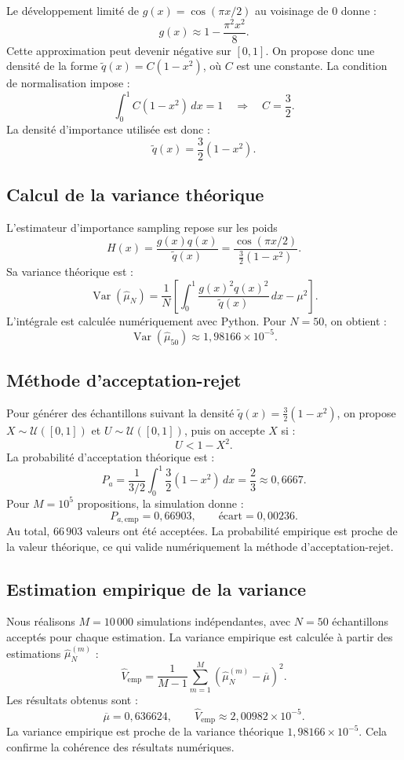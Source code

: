 \documentclass[11pt]{article}
\theoremstyle{definition}
\theoremstyle{remark}
\begin{document}
Le développement limité de $g(x)=\cos(\pi x/2)$ au voisinage de $0$ donne :
\[
g(x)\approx 1-\frac{\pi^2x^2}{8}.
\]
Cette approximation peut devenir négative sur $[0,1]$. On propose donc une
densité de la forme $\widetilde q(x)=C(1-x^2)$, où $C$ est une constante. La
condition de normalisation impose :
\[
\int_0^1 C(1-x^2)\,dx=1
\quad\Longrightarrow\quad C=\frac32.
\]
La densité d'importance utilisée est donc :
\[
\boxed{\widetilde q(x)=\frac32(1-x^2).}
\]

\subsection{Calcul de la variance théorique}

L'estimateur d'importance sampling repose sur les poids
\[
H(x)=\frac{g(x)q(x)}{\widetilde q(x)}
=\frac{\cos(\pi x/2)}{\frac32(1-x^2)}.
\]
Sa variance théorique est :
\[
\operatorname{Var}(\widehat{\mu}_N)
=\frac{1}{N}
\left[
\int_0^1\frac{g(x)^2q(x)^2}{\widetilde q(x)}\,dx
-\mu^2
\right].
\]
L'intégrale est calculée numériquement avec Python. Pour $N=50$, on obtient :
\[
\boxed{
\operatorname{Var}(\widehat{\mu}_{50})
\approx 1{,}98166\times10^{-5}.
}
\]

\subsection{Méthode d'acceptation-rejet}

Pour générer des échantillons suivant la densité
$\widetilde q(x)=\frac32(1-x^2)$, on propose $X\sim\mathcal U([0,1])$ et
$U\sim\mathcal U([0,1])$, puis on accepte $X$ si :
\[
U<1-X^2.
\]
La probabilité d'acceptation théorique est :
\[
P_a=\frac{1}{3/2}\int_0^1
\frac32(1-x^2)\,dx
=\boxed{\frac23\approx 0{,}6667}.
\]
Pour $M=10^5$ propositions, la simulation donne :
\[
P_{a,\mathrm{emp}}=0{,}66903,
\qquad
\text{écart}=0{,}00236.
\]
Au total, $66\,903$ valeurs ont été acceptées. La probabilité empirique est
proche de la valeur théorique, ce qui valide numériquement la méthode
d'acceptation-rejet.

\subsection{Estimation empirique de la variance}

Nous réalisons $M=10\,000$ simulations indépendantes, avec $N=50$ échantillons
acceptés pour chaque estimation. La variance empirique est calculée à partir
des estimations $\widehat{\mu}_N^{(m)}$ :
\[
\widehat V_{\mathrm{emp}}
=\frac{1}{M-1}\sum_{m=1}^{M}
\left(\widehat{\mu}_N^{(m)}-\overline{\mu}\right)^2.
\]
Les résultats obtenus sont :
\[
\overline{\mu}=0{,}636624,
\qquad
\widehat V_{\mathrm{emp}}\approx 2{,}00982\times10^{-5}.
\]
La variance empirique est proche de la variance théorique
$1{,}98166\times10^{-5}$. Cela confirme la cohérence des résultats numériques.
\end{document}
